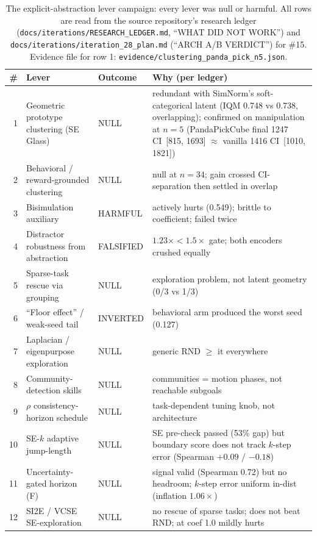 \documentclass{article}
\begin{document}
\begin{table}[t]
\centering
\caption{The explicit-abstraction lever campaign: every lever was null or harmful. All rows are read from the source repository's research ledger (\texttt{docs/iterations/RESEARCH\_LEDGER.md}, ``WHAT DID NOT WORK'') and \texttt{docs/iterations/iteration\_28\_plan.md} (``ARCH A/B VERDICT'') for \#15. Evidence file for row 1: \texttt{evidence/clustering\_panda\_pick\_n5.json}.}
\label{tab:nulls}
\footnotesize
\begin{tabular}{@{}r p{3.6cm} l p{6.6cm}@{}}
\toprule
\# & Lever & Outcome & Why (per ledger) \\
\midrule
1 & Geometric prototype clustering (SE Glass) & NULL & redundant with SimNorm's soft-categorical latent (IQM 0.748 vs 0.738, overlapping); confirmed on manipulation at $n{=}5$ (PandaPickCube final 1247 CI~[815, 1693] $\approx$ vanilla 1416 CI~[1010, 1821]) \\
2 & Behavioral / reward-grounded clustering & NULL & null at $n{=}34$; gain crossed CI-separation then settled in overlap \\
3 & Bisimulation auxiliary \citep[BS-MPC style;][]{shimizu2025bsmpc} & HARMFUL & actively hurts (0.549); brittle to coefficient; failed twice \\
4 & Distractor robustness from abstraction & FALSIFIED & $1.23\times < 1.5\times$ gate; both encoders crushed equally \\
5 & Sparse-task rescue via grouping & NULL & exploration problem, not latent geometry (0/3 vs 1/3) \\
6 & ``Floor effect'' / weak-seed tail & INVERTED & behavioral arm produced the worst seed (0.127) \\
7 & Laplacian / eigenpurpose exploration & NULL & generic RND $\geq$ it everywhere \\
8 & Community-detection skills & NULL & communities = motion phases, not reachable subgoals \\
9 & $\rho$ consistency-horizon schedule & NULL & task-dependent tuning knob, not architecture \\
10 & SE-$k$ adaptive jump-length & NULL & SE pre-check passed (53\% gap) but boundary score does not track $k$-step error (Spearman $+0.09$ / $-0.18$) \\
11 & Uncertainty-gated horizon (F) & NULL & signal valid (Spearman 0.72) but no headroom; $k$-step error uniform in-dist (inflation $1.06\times$) \\
12 & SI2E / VCSE SE-exploration & NULL & no rescue of sparse tasks; does not beat RND; at coef 1.0 mildly hurts \\

\end{tabular}
\end{table}
\end{document}

